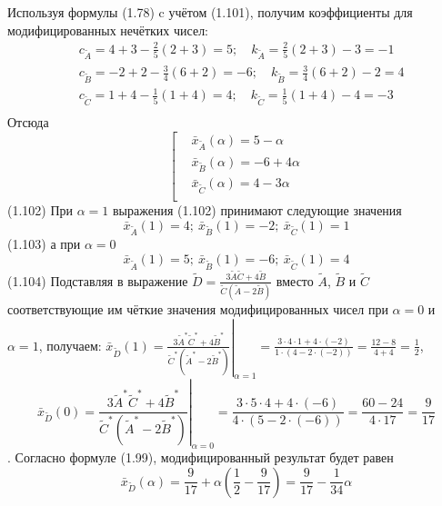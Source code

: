 Используя формулы (1.78) c учётом (1.101), получим коэффициенты для модифицированных нечётких чисел:
	\[\begin{aligned}
  & {{c}_{{\tilde{A}}}}=4+3-\frac{2}{5}\left( 2+3 \right)=5;\quad {{k}_{{\tilde{A}}}}=\frac{2}{5}\left( 2+3 \right)-3=-1 \\ 
 & {{c}_{{\tilde{B}}}}=-2+2-\frac{3}{4}\left( 6+2 \right)=-6;\quad {{k}_{{\tilde{B}}}}=\frac{3}{4}\left( 6+2 \right)-2=4 \\ 
 & {{c}_{{\tilde{C}}}}=1+4-\frac{1}{5}\left( 1+4 \right)=4;\quad {{k}_{{\tilde{C}}}}=\frac{1}{5}\left( 1+4 \right)-4=-3 \\ 
\end{aligned}\] 
Отсюда
	\[\left[ \begin{aligned}
  & {{{\bar{x}}}_{{\tilde{A}}}}\left( \alpha  \right)=5-\alpha  \\ 
 & {{{\bar{x}}}_{{\tilde{B}}}}\left( \alpha  \right)=-6+4\alpha  \\ 
 & {{{\bar{x}}}_{{\tilde{C}}}}\left( \alpha  \right)=4-3\alpha  \\ 
\end{aligned} \right.\] 	(1.102)
При $\alpha=1$ выражения (1.102) принимают следующие значения
	\[{{\bar{x}}_{{\tilde{A}}}}\left( 1 \right)=4;\ {{\bar{x}}_{{\tilde{B}}}}\left( 1 \right)=-2;\ {{\bar{x}}_{{\tilde{C}}}}\left( 1 \right)=1\] 	(1.103)
а при $\alpha=0$
	\[{{\bar{x}}_{{\tilde{A}}}}\left( 1 \right)=5;\ {{\bar{x}}_{{\tilde{B}}}}\left( 1 \right)=-6;\ {{\bar{x}}_{{\tilde{C}}}}\left( 1 \right)=4\] 	(1.104)
Подставляя в выражение $\tilde{D}=\frac{3\tilde{A}\tilde{C}+4\tilde{B}}{\tilde{C}\left( \tilde{A}-2\tilde{B} \right)}$ вместо $\tilde A$, $\tilde B$ и $\tilde C$ соответствующие им чёткие значения модифицированных чисел при $\alpha=0$ и $\alpha=1$, получаем:
	${{\bar{x}}_{{\tilde{D}}}}\left( 1 \right)={{\left. \frac{3{{{\tilde{A}}}^{*}}{{{\tilde{C}}}^{*}}+4{{{\tilde{B}}}^{*}}}{{{{\tilde{C}}}^{*}}\left( {{{\tilde{A}}}^{*}}-2{{{\tilde{B}}}^{*}} \right)} \right|}_{\alpha =1}}=\frac{3\cdot 4\cdot 1+4\cdot \left( -2 \right)}{1\cdot \left( 4-2\cdot \left( -2 \right) \right)}=\frac{12-8}{4+4}=\frac{1}{2}$,
	\[{{\bar{x}}_{{\tilde{D}}}}\left( 0 \right)={{\left. \frac{3{{{\tilde{A}}}^{*}}{{{\tilde{C}}}^{*}}+4{{{\tilde{B}}}^{*}}}{{{{\tilde{C}}}^{*}}\left( {{{\tilde{A}}}^{*}}-2{{{\tilde{B}}}^{*}} \right)} \right|}_{\alpha =0}}=\frac{3\cdot 5\cdot 4+4\cdot \left( -6 \right)}{4\cdot \left( 5-2\cdot \left( -6 \right) \right)}=\frac{60-24}{4\cdot 17}=\frac{9}{17}\].
Согласно формуле (1.99), модифицированный результат будет равен
	\[{{\bar{x}}_{{\tilde{D}}}}\left( \alpha  \right)=\frac{9}{17}+\alpha \left( \frac{1}{2}-\frac{9}{17} \right)=\frac{9}{17}-\frac{1}{34}\alpha \] 
